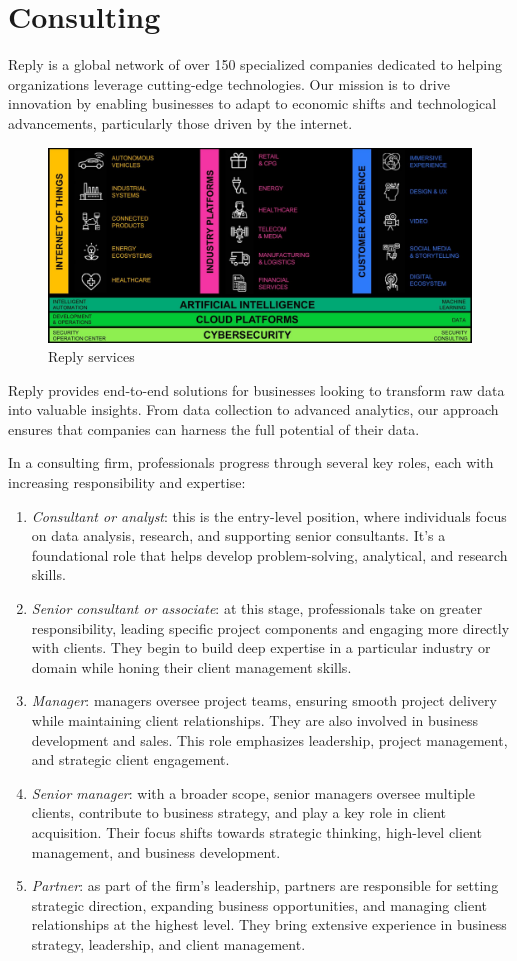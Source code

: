 \section{Consulting}

Reply is a global network of over 150 specialized companies dedicated to helping organizations leverage cutting-edge technologies. 
Our mission is to drive innovation by enabling businesses to adapt to economic shifts and technological advancements, particularly those driven by the internet.
\begin{figure}[H]
    \centering
    \includegraphics[width=0.5\linewidth]{images/bis2.png}
    \caption{Reply services}
\end{figure}
\noindent Reply provides end-to-end solutions for businesses looking to transform raw data into valuable insights. 
From data collection to advanced analytics, our approach ensures that companies can harness the full potential of their data.

In a consulting firm, professionals progress through several key roles, each with increasing responsibility and expertise:
\begin{enumerate}
    \item \textit{Consultant or analyst}: this is the entry-level position, where individuals focus on data analysis, research, and supporting senior consultants. 
        It's a foundational role that helps develop problem-solving, analytical, and research skills.
    \item \textit{Senior consultant or associate}: at this stage, professionals take on greater responsibility, leading specific project components and engaging more directly with clients.
        They begin to build deep expertise in a particular industry or domain while honing their client management skills.
    \item \textit{Manager}: managers oversee project teams, ensuring smooth project delivery while maintaining client relationships. 
        They are also involved in business development and sales. 
        This role emphasizes leadership, project management, and strategic client engagement.
    \item \textit{Senior manager}: with a broader scope, senior managers oversee multiple clients, contribute to business strategy, and play a key role in client acquisition. 
        Their focus shifts towards strategic thinking, high-level client management, and business development.
    \item \textit{Partner}: as part of the firm's leadership, partners are responsible for setting strategic direction, expanding business opportunities, and managing client relationships at the highest level.
        They bring extensive experience in business strategy, leadership, and client management.
\end{enumerate}

